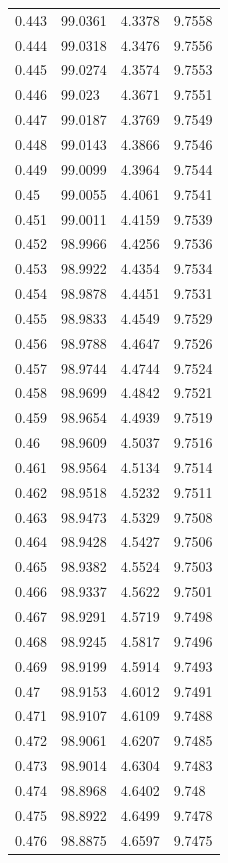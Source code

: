 \begin{tabular}{llll}
0.443 & 99.0361 & 4.3378 & 9.7558 \\
0.444 & 99.0318 & 4.3476 & 9.7556 \\
0.445 & 99.0274 & 4.3574 & 9.7553 \\
0.446 & 99.023 & 4.3671 & 9.7551 \\
0.447 & 99.0187 & 4.3769 & 9.7549 \\
0.448 & 99.0143 & 4.3866 & 9.7546 \\
0.449 & 99.0099 & 4.3964 & 9.7544 \\
0.45 & 99.0055 & 4.4061 & 9.7541 \\
0.451 & 99.0011 & 4.4159 & 9.7539 \\
0.452 & 98.9966 & 4.4256 & 9.7536 \\
0.453 & 98.9922 & 4.4354 & 9.7534 \\
0.454 & 98.9878 & 4.4451 & 9.7531 \\
0.455 & 98.9833 & 4.4549 & 9.7529 \\
0.456 & 98.9788 & 4.4647 & 9.7526 \\
0.457 & 98.9744 & 4.4744 & 9.7524 \\
0.458 & 98.9699 & 4.4842 & 9.7521 \\
0.459 & 98.9654 & 4.4939 & 9.7519 \\
0.46 & 98.9609 & 4.5037 & 9.7516 \\
0.461 & 98.9564 & 4.5134 & 9.7514 \\
0.462 & 98.9518 & 4.5232 & 9.7511 \\
0.463 & 98.9473 & 4.5329 & 9.7508 \\
0.464 & 98.9428 & 4.5427 & 9.7506 \\
0.465 & 98.9382 & 4.5524 & 9.7503 \\
0.466 & 98.9337 & 4.5622 & 9.7501 \\
0.467 & 98.9291 & 4.5719 & 9.7498 \\
0.468 & 98.9245 & 4.5817 & 9.7496 \\
0.469 & 98.9199 & 4.5914 & 9.7493 \\
0.47 & 98.9153 & 4.6012 & 9.7491 \\
0.471 & 98.9107 & 4.6109 & 9.7488 \\
0.472 & 98.9061 & 4.6207 & 9.7485 \\
0.473 & 98.9014 & 4.6304 & 9.7483 \\
0.474 & 98.8968 & 4.6402 & 9.748 \\
0.475 & 98.8922 & 4.6499 & 9.7478 \\
0.476 & 98.8875 & 4.6597 & 9.7475 \\

\end{tabular}
